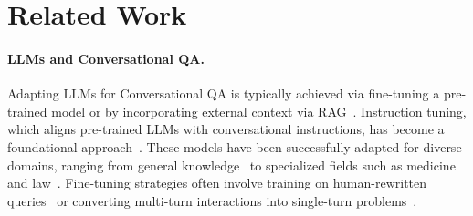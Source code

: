 \documentclass[11pt]{article}
\begin{document}


\section{Related Work}

\paragraph{LLMs and Conversational QA.}
Adapting LLMs for Conversational QA is typically achieved via fine-tuning a pre-trained model or by incorporating external context via RAG~\cite{dhabalia_comparative_2025}. Instruction tuning, which aligns pre-trained LLMs with conversational instructions, has become a foundational approach~\cite{zhang_instruction_2025}. These models have been successfully adapted for diverse domains, ranging from general knowledge~\cite{yang_hotpotqa_2018, joshi_triviaqa_2017} to specialized fields such as medicine~\cite{li_chatdoctor_2023, prayitno_conversational_2025} and law~\cite{wu_study_2025}. Fine-tuning strategies often involve training on human-rewritten queries~\cite{mo_convgqr_2023} or converting multi-turn interactions into single-turn problems~\cite{ye_enhancing_2023}.
\end{document}
